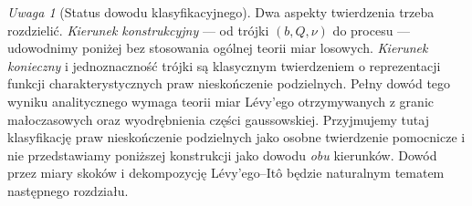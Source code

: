 \documentclass[11pt,a4paper,oneside]{report}
\numberwithin{equation}{chapter}
\theoremstyle{plain}
\theoremstyle{definition}
\theoremstyle{remark}
\newtheorem{uwaga}{Uwaga}[chapter]
\begin{document}
\begin{uwaga}[Status dowodu klasyfikacyjnego]
Dwa aspekty twierdzenia trzeba rozdzielić. \emph{Kierunek
konstrukcyjny} --- od trójki $(b,Q,\nu)$ do procesu ---
udowodnimy poniżej bez stosowania ogólnej teorii miar losowych.
\emph{Kierunek konieczny} i jednoznaczność trójki
są klasycznym twierdzeniem o reprezentacji funkcji
charakterystycznych praw nieskończenie podzielnych.
Pełny dowód tego wyniku analitycznego wymaga teorii
miar Lévy'ego otrzymywanych z granic małoczasowych
oraz wyodrębnienia części gaussowskiej. Przyjmujemy tutaj
klasyfikację praw nieskończenie podzielnych jako
osobne twierdzenie pomocnicze i nie przedstawiamy poniższej
konstrukcji jako dowodu \emph{obu} kierunków.
Dowód przez miary skoków i dekompozycję Lévy'ego--Itô
będzie naturalnym tematem następnego rozdziału.
\end{uwaga}
\end{document}
